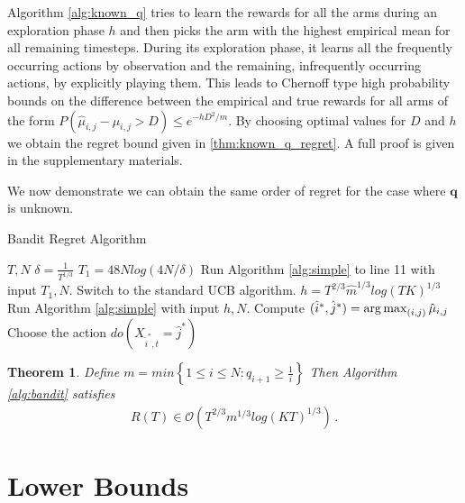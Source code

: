 \documentclass{article}
\newcommand{\set}[1]{\left\{#1\right\}}
\newcommand{\argmax}{\operatornamewithlimits{arg\,max}}
\newcommand{\eq}[1]{\begin{align*}#1\end{align*}}
\newcommand{\bigo}[1]{\mathcal{O}\left( #1 \right)}
\theoremstyle{plain}
\newtheorem{theorem}{Theorem}
\theoremstyle{definition}
\begin{document}
Algorithm \ref{alg:known_q} tries to learn the rewards for all the arms during an exploration phase $h$ and then picks the arm with the highest empirical mean for all remaining timesteps. During its exploration phase, it learns all the frequently occurring actions by observation and the remaining, infrequently occurring actions, by explicitly playing them. This leads to Chernoff type high probability bounds on the difference between the empirical and true rewards for all arms of the form $P(\hat{\mu}_{i,j} - \mu_{i,j} > D) \leq e^{-hD^2/m}$. By choosing optimal values for $D$ and $h$ we obtain the regret bound given in \cref{thm:known_q_regret}. A full proof is given in the supplementary materials. 

We now demonstrate we can obtain the same order of regret for the case where $\boldsymbol{q}$ is unknown. 

\begin{algorithm}[h]
\caption{Bandit Regret Algorithm}\label{alg:bandit}
\begin{algorithmic}[1]
 $T, N$
\STATE $\delta = \frac{1}{T^{1/3}}$ 
\STATE $T_1 = 48Nlog\left(4N/\delta\right)$ 
\STATE Run Algorithm \ref{alg:simple} to line 11 with input $T_1,N$.
\STATE Switch to the standard UCB algorithm.
\ELSE
\STATE $h = T^{2/3}\hat{m}^{1/3}log(TK)^{1/3}$ 
\STATE Run Algorithm \ref{alg:simple} with input $h,N$.
\STATE Compute $(\hat{i}^*,\hat{j}^*) = \argmax_{(i,j)} \hat{\mu}_{i,j}$
\STATE Choose the action $do(X_{\hat{i}^*,t} = \hat{j}^*)$
\ENDFOR
\ENDIF
\end{algorithmic}
\end{algorithm}

\begin{theorem}\label{thm:unknown_q_regret}
Define $m =   min\set{1 \leq i \leq N:q_{i+1} \geq \frac{1}{i}}$
Then Algorithm \ref{alg:bandit} satisfies
\eq{
R(T) \in \bigo{T^{2/3}m^{1/3}log(KT)^{1/3}}\,.
}
\end{theorem}


\section{Lower Bounds}




\end{document}
